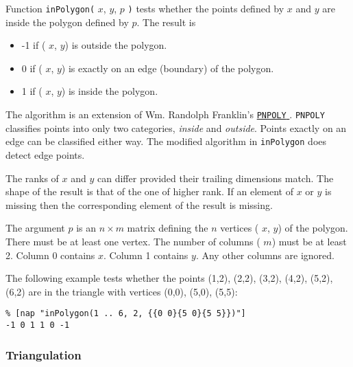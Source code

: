  \par Function 
  \texttt{inPolygon(} 
  $x$, 
  $y$, 
  $p$ 
  \texttt{)} tests whether the points defined by 
  $x$ and 
  $y$ are inside the polygon defined by 
  $p$. The result is
  \begin{itemize}
    \item -1 if ( 
    $x$, 
    $y$) is outside the polygon.
    \item 0 if ( 
    $x$, 
    $y$) is exactly on an edge (boundary) of the polygon.
    \item 1 if ( 
    $x$, 
    $y$) is inside the polygon.
  \end{itemize}
  \par The algorithm is an extension of Wm. Randolph Franklin's 
  \href{http://www.ecse.rpi.edu/Homepages/wrf/research/geom/pnpoly.html}{ \texttt{PNPOLY} } . 
  \texttt{PNPOLY} classifies points into only two categories, 
  \textit{inside} and 
  \textit{outside}. Points exactly on an edge can be classified either
  way. The modified algorithm in 
  \texttt{inPolygon} does detect edge points.
  \par The ranks of 
  $x$ and 
  $y$ can differ provided their trailing dimensions match. The
  shape of the result is that of the one of higher rank. If an element
  of 
  $x$ or 
  $y$ is missing then the corresponding element of the result
  is missing.
  \par The argument 
  $p$ is an 
  $n\times  m$ matrix defining the 
  $n$ vertices ( 
  $x$, 
  $y$) of the polygon. There must be at least one vertex. The
  number of columns ( 
  $m$) must be at least 2. Column 0 contains 
  $x$. Column 1 contains 
  $y$. Any other columns are ignored.
  \par The following example tests whether the points (1,2), (2,2),
  (3,2), (4,2), (5,2), (6,2) are in the triangle with vertices (0,0),
  (5,0), (5,5):
  \begin{verbatim}
% [nap "inPolygon(1 .. 6, 2, {{0 0}{5 0}{5 5}})"]
-1 0 1 1 0 -1
\end{verbatim}

  \subsubsection{
    \label{Triangulation}Triangulation
  }

